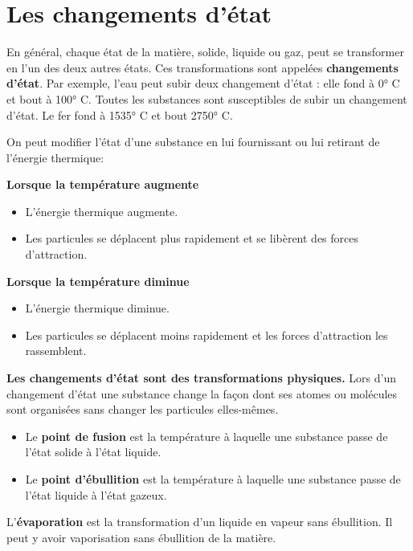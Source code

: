 \documentclass[
  11pt,
  a4paper,
  openany]{book}
\providecommand{\tightlist}{%
  \setlength{\itemsep}{0pt}\setlength{\parskip}{0pt}}
\begin{document}
\hypertarget{les-changements-duxe9tat}{%
\section{Les changements d'état}\label{les-changements-duxe9tat}}

En général, chaque état de la matière, solide, liquide ou gaz, peut se transformer en l'un des deux autres états. Ces transformations sont appelées \textbf{changements d'état}. Par exemple, l'eau peut subir deux changement d'état : elle fond à 0° C et bout à 100° C. Toutes les substances sont susceptibles de subir un changement d'état. Le fer fond à 1535° C et bout 2750° C.

On peut modifier l'état d'une substance en lui fournissant ou lui retirant de l'énergie thermique:

\textbf{Lorsque la température augmente}

\begin{itemize}
\tightlist
\item
  L'énergie thermique augmente.
\item
  Les particules se déplacent plus rapidement et se libèrent des forces d'attraction.
\end{itemize}

\textbf{Lorsque la température diminue}

\begin{itemize}
\tightlist
\item
  L'énergie thermique diminue.
\item
  Les particules se déplacent moins rapidement et les forces d'attraction les rassemblent.
\end{itemize}

\textbf{Les changements d'état sont des transformations physiques.} Lors d'un changement d'état une substance change la façon dont ses atomes ou molécules sont organisées sans changer les particules elles-mêmes.

\begin{itemize}
\tightlist
\item
  Le \textbf{point de fusion} est la température à laquelle une substance passe de l'état solide à l'état liquide.
\item
  Le \textbf{point d'ébullition} est la température à laquelle une substance passe de l'état liquide à l'état gazeux.
\end{itemize}

L'\textbf{évaporation} est la transformation d'un liquide en vapeur sans ébullition. Il peut y avoir vaporisation sans ébullition de la matière.
\end{document}
